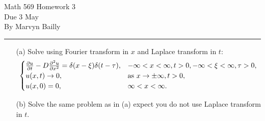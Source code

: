 \documentclass[12pt]{report}
\begin{document}
\large

\begin{center}
 Math 569 Homework 3\\
 Due 3 May\\
 By Marvyn Bailly\\
\end{center}

\normalsize

\hrule



\begin{problem}
    \begin{enumerate}
        \item [(a)]
        Solve using Fourier transform in $x$ and Laplace transform in $t$:
        \begin{align*}
            \begin{cases} 
                \frac{\partial u}{\partial t} - D \frac{\partial^{2} u}{\partial x^{2}} = \delta(x - \xi)\delta(t - \tau),  &-\infty < x < \infty, t > 0, -\infty < \xi < \infty, \tau > 0,\\
                u(x,t) \to 0, &\text{as}~ x \to \pm \infty, t>0,\\
                u(x,0) = 0, &\infty<x<\infty. 
            \end{cases}
        \end{align*}
        \item [(b)]
        Solve the same problem as in (a) expect you do not use Laplace transform in $t$. 


    \end{enumerate}
    
\end{problem}
\end{document}
